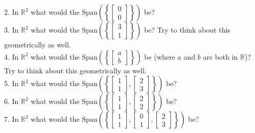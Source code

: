\documentclass[12pt]{article}
\begin{document}
2. In $\mathbb{R}^2$ what would the $\text{Span}\left (\left \{ \left[ \begin{array}{c}  0 \\ 0  \end{array} \right] \right\} \right)$ be? \\

3. In $\mathbb{R}^2$ what would the $\text{Span}\left (\left \{ \left[ \begin{array}{c}  3 \\ 1  \end{array} \right] \right\} \right)$ be? Try to think about this geometrically as well.\\

4. In $\mathbb{R}^2$ what would the $\text{Span}\left (\left \{ \left[ \begin{array}{c}  a \\ b  \end{array} \right] \right\} \right)$ be (where $a$ and $b$ are both in $\mathbb{R}$)?  Try to think about this geometrically as well.\\

5. In $\mathbb{R}^2$ what would the $\text{Span}\left (\left \{ \left[ \begin{array}{c} 1  \\ 1  \end{array} \right] , \left[ \begin{array}{c} 2  \\ 3  \end{array} \right]\right\} \right)$ be?  \\

6. In $\mathbb{R}^2$ what would the $\text{Span}\left (\left \{ \left[ \begin{array}{c} 1  \\ 1  \end{array} \right] , \left[ \begin{array}{c} 2  \\ 2  \end{array} \right]\right\} \right)$ be?  \\

7. In $\mathbb{R}^2$ what would the $\text{Span}\left (\left \{ \left[ \begin{array}{c} 1  \\ 1  \end{array} \right] ,\left[ \begin{array}{c} 0  \\ 1  \end{array} \right] ,\left[ \begin{array}{c} 2  \\ 3  \end{array} \right]\right\} \right)$ be?  \\
\end{document}
